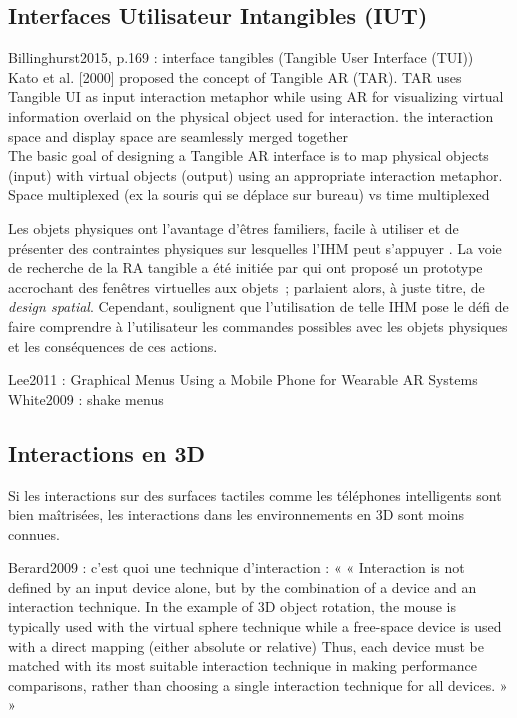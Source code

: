 \subsection{Interfaces Utilisateur Intangibles (IUT)}
Billinghurst2015, p.169 : interface tangibles (Tangible User Interface (TUI))\\
Kato et al. [2000] proposed the concept of Tangible AR (TAR). TAR uses Tangible UI as input interaction metaphor while using AR for visualizing virtual information overlaid on the physical object used for interaction. the interaction space and display space are seamlessly merged together\\
The basic goal of designing a Tangible AR interface is to map physical objects (input) with virtual objects (output) using an appropriate interaction metaphor.\\
Space multiplexed (ex la souris qui se déplace sur bureau) vs time multiplexed

Les objets physiques ont l'avantage d'êtres familiers, facile à utiliser et de présenter des contraintes physiques sur lesquelles l'IHM peut s'appuyer \citep{ZhouDuhBillinghurst2008}. La voie de recherche de la RA tangible a été initiée par \citet{FeinerMacIntyreHauptEtAl1993} qui ont proposé un prototype accrochant des fenêtres virtuelles aux objets~; \citeauthor{FeinerMacIntyreHauptEtAl1993} parlaient alors, à juste titre, de \emph{design spatial}. Cependant, \citeauthor{ZhouDuhBillinghurst2008} soulignent que l'utilisation de telle IHM pose le défi de faire comprendre à l'utilisateur les commandes possibles avec les objets physiques et les conséquences de ces actions.

Lee2011 : Graphical Menus Using a Mobile Phone for Wearable AR Systems\\
White2009 : shake menus

\subsection{Interactions en 3D}
Si les interactions sur des surfaces tactiles comme les téléphones intelligents sont bien maîtrisées, les interactions dans les environnements en 3D sont moins connues.

Berard2009 : c'est quoi une technique d'interaction : « « Interaction is not defined by an input device alone, but by the combination of a device and an interaction technique. In the example of 3D object rotation, the mouse is typically used with the virtual sphere technique while a free-space device is used with a direct mapping (either absolute or relative) Thus, each device must be matched with its most suitable interaction technique in making performance comparisons, rather than choosing a single interaction technique for all devices. » »

